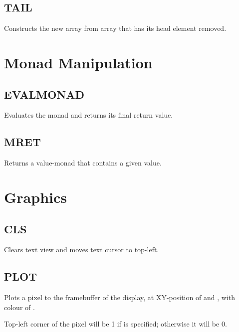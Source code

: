     \subsection{TAIL}
        \par
        Constructs the new array from array  that has its head element removed.

\section{Monad Manipulation}

    \subsection{EVALMONAD}
        \par
        Evaluates the monad and returns its final return value.
    \subsection{MRET}
        \par
        Returns a value-monad that contains a given value.
        
\section{Graphics}

    \subsection{CLS}
        \par
        Clears text view and moves text cursor to top-left.
    \subsection{PLOT}
        \par
        Plots a pixel to the framebuffer of the display, at XY-position of  and , with colour of .\par
        Top-left corner of the pixel will be 1 if  is specified; otherwise it will be 0.


